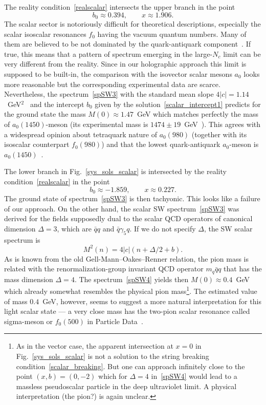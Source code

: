 \documentclass[a4paper,11pt]{article}
\begin{document}
The reality condition~\eqref{realscalar} intersects the upper branch in the point
\begin{equation}
\label{scalar_intercept1}
  b_0\approx0.394,\qquad x\approx1.906.
\end{equation}
The scalar sector is notoriously difficult for theoretical descriptions, especially
the scalar isoscalar resonances $f_0$ having the vacuum quantum numbers. Many of
them are believed to be not dominated by the quark-antiquark component~\cite{pdg}.
If true, this means that a pattern of spectrum emerging in the large-$N_c$ limit
can be very different from the reality. Since in our holographic approach this limit is supposed to be built-in,
the comparison with the isovector scalar
mesons $a_0$ looks more reasonable but the corresponding experimental data are scarce.
Nevertheless, the spectrum~\eqref{spSW3} with the standard mean slope $4|c|=1.14$~GeV$^2$~\cite{Bugg:2004xu}
and the intercept $b_0$ given by the solution~\eqref{scalar_intercept1} predicts for the ground state the mass
$M(0)\approx1.47$~GeV which matches perfectly the mass of $a_0(1450)$-meson (its experimental mass is
$1474\pm19$~GeV~\cite{pdg}). This agrees with a widespread opinion
about tetraquark nature of $a_0(980)$ (together with its isoscalar counterpart
$f_0(980)$) and that the lowest quark-antiquark $a_0$-meson is $a_0(1450)$~\cite{pdg}.

The lower branch in Fig.~\ref{sys_sols_scalar} is intersected by the reality condition~\eqref{realscalar} in the point
\begin{equation}
\label{scalar_intercept2}
  b_0\approx-1.859,\qquad x\approx 0.227.
\end{equation}
The ground state of spectrum~\eqref{spSW3} is then tachyonic. This looks like a failure of our approach.
On the other hand, the scalar SW spectrum~\eqref{spSW3} was derived for the fields supposedly dual to the
scalar QCD operators of canonical dimension $\Delta=3$, which are $\bar{q}q$ and $\bar{q}\gamma_5q$. If we
do not specify $\Delta$, the SW scalar spectrum is~\cite{afonin2020}
\begin{equation}
\label{spSW4}
  M^2(n)=4|c|(n+\Delta/2+b).
\end{equation}
As is known from the old Gell-Mann--Oakes--Renner relation, the pion mass is related with the renormalization-group invariant QCD operator
$m_q\bar{q}q$ that has the mass dimension $\Delta=4$. The spectrum~\eqref{spSW4} yields then
$M(0)\approx0.4$~GeV which already somewhat resembles the physical pion mass\footnote{As in the vector case, the apparent intersection at $x=0$
in Fig.~\ref{sys_sols_scalar} is not a solution to the string breaking condition~\eqref{scalar_breaking}. But one can approach infinitely close to
the point $(x,b)=(0,-2)$ which for $\Delta=4$ in~\eqref{spSW4} would lead to a massless pseudoscalar particle in the deep ultraviolet limit.
A physical interpretation (the pion?) is again unclear.}.
The estimated value of mass $0.4$~GeV, however, seems to suggest a more natural interpretation for this light scalar state ---
a very close mass has the two-pion scalar resonance called sigma-meson or $f_0(500)$ in Particle Data~\cite{pdg}.
\end{document}
